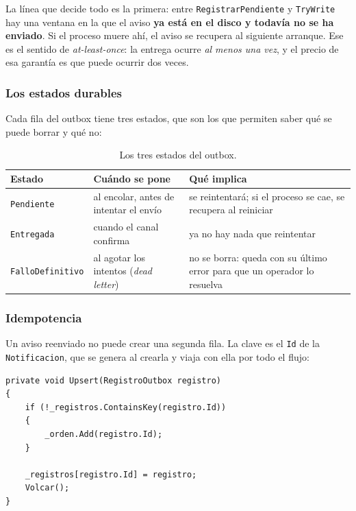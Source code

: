 La línea que decide todo es la primera: entre \texttt{RegistrarPendiente} y \texttt{TryWrite} hay
una ventana en la que el aviso \textbf{ya está en el disco y todavía no se ha enviado}. Si el
proceso muere ahí, el aviso se recupera al siguiente arranque. Ese es el sentido de
\emph{at-least-once}: la entrega ocurre \emph{al menos una vez}, y el precio de esa garantía es que
puede ocurrir dos veces.

\subsubsection{Los estados durables}

Cada fila del outbox tiene tres estados, que son los que permiten saber qué se puede borrar y
qué no:

\begin{table}[H]
\centering
\small
\begin{tabularx}{\textwidth}{>{\raggedright\arraybackslash}p{3.4cm} >{\raggedright\arraybackslash}X >{\raggedright\arraybackslash}p{3.6cm}}
\toprule
\textbf{Estado} & \textbf{Cuándo se pone} & \textbf{Qué implica} \\
\midrule
\texttt{Pendiente} & al encolar, antes de intentar el envío & se reintentará; si el proceso se cae, se recupera al reiniciar \\
\addlinespace
\texttt{Entregada} & cuando el canal confirma & ya no hay nada que reintentar \\
\addlinespace
\texttt{FalloDefinitivo} & al agotar los intentos (\emph{dead letter}) & no se borra: queda con su último error para que un operador lo resuelva \\
\bottomrule
\end{tabularx}
\caption{Los tres estados del outbox.}
\end{table}

\subsubsection{Idempotencia}

Un aviso reenviado no puede crear una segunda fila. La clave es el \texttt{Id} de la
\texttt{Notificacion}, que se genera al crearla y viaja con ella por todo el flujo:

\begin{lstlisting}[basicstyle=\ttfamily\footnotesize, columns=fullflexible, keepspaces=true, caption={El registro es un \emph{upsert} por \texttt{Id}: reenviar no duplica.}]
private void Upsert(RegistroOutbox registro)
{
    if (!_registros.ContainsKey(registro.Id))
    {
        _orden.Add(registro.Id);
    }

    _registros[registro.Id] = registro;
    Volcar();
}
\end{lstlisting}

